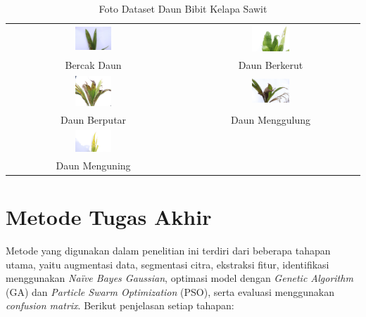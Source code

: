 \begin{table}[H]
	\centering
	\begin{tabular}{|c|c|}
		\hline
		\includegraphics[width=0.22\textwidth]{figure/chapter-2-bercak-daun.jpg} & \includegraphics[width=0.22\textwidth]{figure/chapter-2-daun-berkerut.jpg} \\
		\small Bercak Daun & \small Daun Berkerut \\
		\hline
		\includegraphics[width=0.22\textwidth]{figure/chapter-2-daun-berputar.jpg} & \includegraphics[width=0.22\textwidth]{figure/chapter-2-daun-menggulung.jpg} \\
		\small Daun Berputar & \small Daun Menggulung \\
		\hline
		\includegraphics[width=0.22\textwidth]{figure/chapter-2-daun-menguning.jpg} & {} \\
		\small Daun Menguning & \\
		\hline
	\end{tabular}
	\caption{Foto Dataset Daun Bibit Kelapa Sawit}
	\label{tab:tabel-foto}
\end{table}

\section{Metode Tugas Akhir} \label{III.Metode}
Metode yang digunakan dalam penelitian ini terdiri dari beberapa tahapan utama, yaitu augmentasi data, segmentasi citra, ekstraksi fitur, identifikasi menggunakan \textit{Naïve Bayes Gaussian}, optimasi model dengan \textit{Genetic Algorithm} (GA) dan \textit{Particle Swarm Optimization} (PSO), serta evaluasi menggunakan \textit{confusion matrix}. Berikut penjelasan setiap tahapan:

